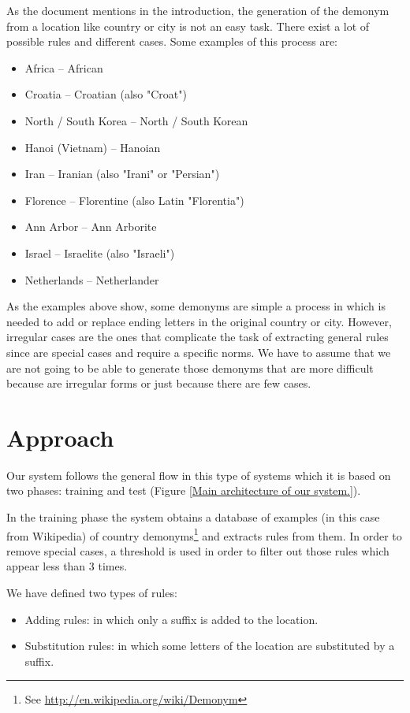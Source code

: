 \documentclass[]{article}
\begin{document}
As the document mentions in the introduction, the generation of the demonym from a location like country or city is not an easy task. There exist a lot of possible rules and different cases. 
\vspace{0.5cm}
Some examples of this process are:
\begin{itemize}
\item Africa -- African
\item Croatia -- Croatian (also "Croat")
\item North / South Korea -- North / South Korean
\item Hanoi (Vietnam) -- Hanoian
\item Iran -- Iranian (also "Irani" or "Persian")
\item Florence -- Florentine (also Latin "Florentia")
\item Ann Arbor -- Ann Arborite
\item Israel -- Israelite (also "Israeli")
\item Netherlands -- Netherlander
\end{itemize}

As the examples above show, some demonyms are simple a process in which is needed to add or replace ending letters in the original country or city. However, irregular cases are the ones that complicate the task of extracting general rules since are special cases and require a specific norms. We have to assume that we are not going to be able to generate those demonyms that are more difficult because are irregular forms or just because there are few cases.



\section{Approach}


Our system follows the general flow in this type of systems which it is based on two phases: training and test (Figure \ref{Main architecture of our system.}). 

In the training phase the system obtains a database of examples (in this case from Wikipedia) of country demonyms\footnote{See \href{Wikipedia Demonym page}{http://en.wikipedia.org/wiki/Demonym}} and extracts rules from them.
In order to remove special cases, a threshold is used in order to filter out those rules which appear less than 3 times.

We have defined two types of rules:
\begin{itemize}
\item Adding rules: in which only a suffix is added to the location.
\item Substitution rules: in which some letters of the location are substituted by a suffix.
\end{itemize}
\end{document}
